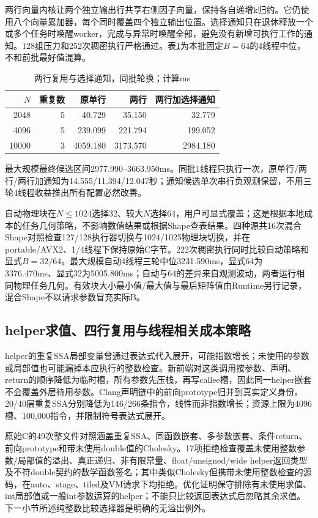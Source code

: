 \documentclass[UTF8,a4paper,11pt]{ctexart}
\begin{document}
两行向量内核让两个独立输出行共享右侧因子向量，保持各自递增k归约。它仍使用八个向量累加器，每个同时覆盖四个独立输出位置。选择通知只在退休释放一个或多个任务时唤醒worker，完成与异常时唤醒全部，避免没有新增可执行工作的通知。128组压力和252次稠密执行严格通过。表\ref{tab:rows}为本批固定$B=64$的4线程中位，不和前批最好值混算。
\begin{table}[htbp]\centering\small
\caption{两行复用与选择通知，同批轮换；计算ms}\label{tab:rows}
\begin{tabular}{rrrrr}\toprule
$N$&重复数&原单行&两行&两行加选择通知\\\midrule
2048&5&40.729&35.150&32.779\\
4096&5&239.099&221.794&199.052\\
10000&3&4059.180&3173.570&2984.180\\\bottomrule
\end{tabular}
\end{table}
最大规模最终候选区间2977.990--3663.950ms。同批1线程只执行一次，原单行/两行/两行加通知为14.555/11.394/12.047秒；通知候选单次串行负观测保留，不用三轮4线程收益推出所有配置必然改善。

自动物理块在$N\leq1024$选择32、较大$N$选择64，用户可显式覆盖；这是根据本地成本的任务几何策略，不影响数值结果或根据Shape查表结果。四种源共16次混合Shape对照检查127/128执行器切换与1024/1025物理块切换，并在portable/AVX2、1/4线程下保持原始C字节。222次稠密执行同时比较自动策略和显式$B=32/64$。最大规模自动4线程三轮中位3231.590ms，显式64为3376.470ms、显式32为5005.800ms；自动与64的差异来自观测波动，两者运行相同物理任务几何。有效块大小最小值/最大值与最后矩阵值由Runtime另行记录，混合Shape不以请求参数冒充实际B。

\subsection{helper求值、四行复用与线程相关成本策略}
helper的重复SSA局部变量曾通过表达式代入展开，可能指数增长；未使用的参数或局部值也可能漏掉本应执行的整数检查。新前端对这类调用按参数、声明、return的顺序降低为临时槽，所有参数先压栈，再写callee槽，因此同一helper嵌套不会覆盖外层待用参数。Clang声明链中的前向prototype归并到真实定义身份。20/40层重复SSA分别降低为146/266条指令，线性而非指数增长；资源上限为4096槽、100,000指令，并限制符号表达式展开。

原始C的49次整文件对照涵盖重复SSA、同函数嵌套、多参数嵌套、条件return、前向prototype和带未使用double值的Cholesky。17项拒绝检查覆盖未使用整数参数/局部值的溢出、真正递归、非有限常量、float/unsigned/wide helper返回类型及不符double契约的数学函数签名；其中类似Cholesky但携带未使用整数检查的源码，在auto、stage、tiled及VM请求下均拒绝。优化证明保守排除有未使用求值、int局部值或一般int参数运算的helper；不能只比较返回表达式后忽略其余求值。下一小节所述纯整数比较选择器是明确的无溢出例外。
\end{document}
